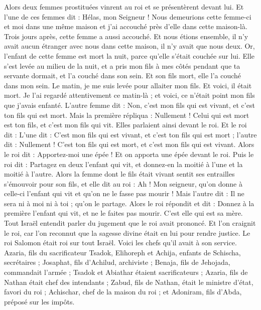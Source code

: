 \begin{multicols}{2}
Alors deux femmes prostituées vinrent au roi et se présentèrent devant lui.
Et l'une de ces femmes dit : Hélas, mon Seigneur ! Nous demeurions cette femme-ci et moi dans une même maison et j'ai accouché près d’elle dans cette maison-là.
Trois jours après, cette femme a aussi accouché. Et nous étions ensemble, il n'y avait aucun étranger avec nous dans cette maison, il n’y avait que nous deux.
Or, l'enfant de cette femme est mort la nuit, parce qu'elle s'était couchée sur lui.
Elle s'est levée au milieu de la nuit, et a pris mon fils à mes côtés pendant que ta servante dormait, et l'a couché dans son sein. Et son fils mort, elle l’a couché dans mon sein.
Le matin, je me suis levée pour allaiter mon fils. Et voici, il était mort. Je l’ai regardé attentivement ce matin-là ; et voici, ce n'était point mon fils que j'avais enfanté.
L’autre femme dit : Non, c’est mon fils qui est vivant, et c’est ton fils qui est mort. Mais la première répliqua : Nullement ! Celui qui est mort est ton fils, et c’est mon fils qui vit. Elles parlaient ainsi devant le roi.
Et le roi dit : L’une dit : C’est mon fils qui est vivant, et c’est ton fils qui est mort ; l’autre dit : Nullement ! C’est ton fils qui est mort, et c’est mon fils qui est vivant.
Alors le roi dit : Apportez-moi une épée ! Et on apporta une épée devant le roi.
Puis le roi dit : Partagez en deux l'enfant qui vit, et donnez-en la moitié à l'une et la moitié à l'autre.
Alors la femme dont le fils était vivant sentit ses entrailles s’émouvoir pour son fils, et elle dit au roi : Ah ! Mon seigneur, qu'on donne à celle-ci l'enfant qui vit et qu'on ne le fasse pas mourir ! Mais l'autre dit : Il ne sera ni à moi ni à toi ; qu'on le partage.
Alors le roi répondit et dit : Donnez à la première l'enfant qui vit, et ne le faites pas mourir. C’est elle qui est sa mère.
Tout Israël entendit parler du jugement que le roi avait prononcé. Et l’on craignit le roi, car l’on reconnut que la sagesse divine était en lui pour rendre justice.
\VerseOne{}Le roi Salomon était roi sur tout Israël.
Voici les chefs qu’il avait à son service. Azaria, fils du sacrificateur Tsadok,
Elihoreph et Achija, enfants de Schischa, secrétaires ; Josaphat, fils d'Achilud, archiviste ;
Benaja, fils de Jehojada, commandait l'armée ; Tsadok et Abiathar étaient sacrificateurs ;
Azaria, fils de Nathan était chef des intendants ; Zabud, fils de Nathan, était le ministre d’état, favori du roi ;
Achischar, chef de la maison du roi ; et Adoniram, fils d’Abda, préposé sur les impôts.

\end{multicols}
